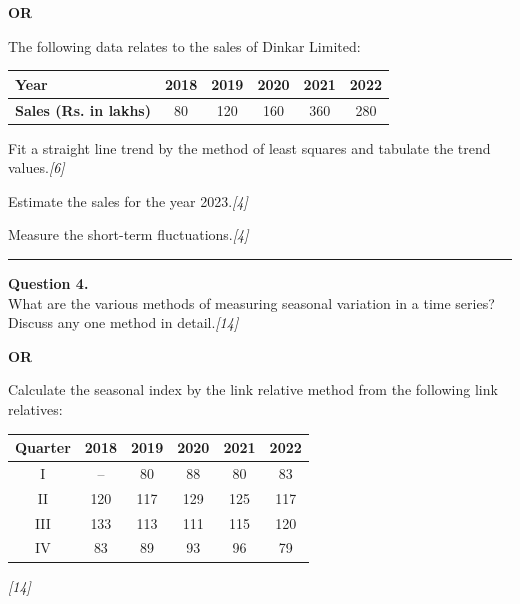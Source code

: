 \documentclass[11pt,a4paper]{article}
\newcommand{\pts}[1]{\hfill   \textit{[#1]}}
\begin{document}
\centerline{   \textbf{OR}}

The following data relates to the sales of Dinkar Limited:

\begin{center}
\renewcommand{\arraystretch}{1.2}
\small

\begin{tabular}{|l|c|c|c|c|c|}
\hline
   \textbf{Year}                 & 2018 & 2019 & 2020 & 2021 & 2022 \\ \hline
   \textbf{Sales (Rs. in lakhs)} & 80   & 120  & 160  & 360  & 280  \\ \hline
\end{tabular}
\end{center}

\begin{parts}
  \item Fit a straight line trend by the method of least squares and tabulate the trend values.\pts{6}
  \item Estimate the sales for the year 2023.\pts{4}
  \item Measure the short-term fluctuations.\pts{4}
\end{parts}

\medskip\rule{\linewidth}{0.2pt}




\noindent   \textbf{Question 4.} \\
What are the various methods of measuring seasonal variation in a time series? Discuss any one method in detail.\pts{14}

\centerline{   \textbf{OR}}

Calculate the seasonal index by the link relative method from the following link relatives:

\begin{center}
\renewcommand{\arraystretch}{1.2}
\small

\begin{tabular}{|c|c|c|c|c|c|}
\hline
   \textbf{Quarter} &   \textbf{2018} &   \textbf{2019} &   \textbf{2020} &   \textbf{2021} &   \textbf{2022} \\ \hline
I                & --            & 80            & 88            & 80            & 83            \\
II               & 120           & 117           & 129           & 125           & 117           \\
III              & 133           & 113           & 111           & 115           & 120           \\
IV               & 83            & 89            & 93            & 96            & 79            \\ \hline
\end{tabular}
\end{center}\pts{14}
\end{document}
